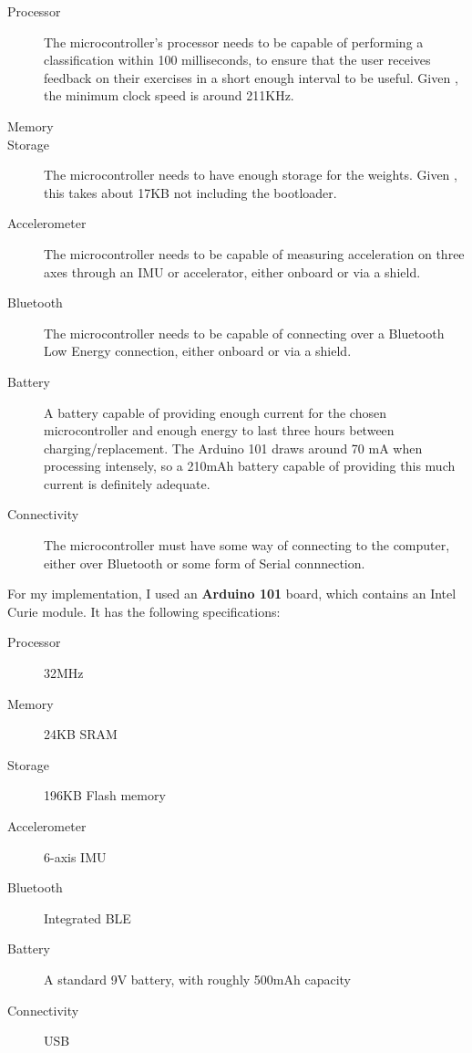 \documentclass[a4paper]{article}
\begin{document}
\begin{description}
\item[Processor] The microcontroller's processor needs to be capable of performing a classification within 100 milliseconds, to ensure that the user receives feedback on their exercises in a short enough interval to be useful. Given , the minimum clock speed is around 211KHz.\cite{dsref0}
\item[Memory] 
\item[Storage] The microcontroller needs to have enough storage for the weights. Given , this takes about 17KB not including the bootloader\cite{dsref2}.
\item[Accelerometer] The microcontroller needs to be capable of measuring acceleration on three axes through an IMU or accelerator, either onboard or via a shield.
\item[Bluetooth] The microcontroller needs to be capable of connecting over a Bluetooth Low Energy connection, either onboard or via a shield.
\item[Battery] A battery capable of providing enough current for the chosen microcontroller and enough energy to last three hours between charging/replacement. The Arduino 101 draws around 70 mA when processing intensely,\cite{dsref3} so a 210mAh battery capable of providing this much current is definitely adequate.
\item[Connectivity] The microcontroller must have some way of connecting to the computer, either over Bluetooth or some form of Serial connnection.
\end{description}

For my implementation, I used an \textbf{Arduino 101} board, which contains an Intel Curie module. It has the following specifications:\cite{dsref4}

\begin{description}
\item[Processor] 32MHz
\item[Memory] 24KB SRAM
\item[Storage] 196KB Flash memory
\item[Accelerometer] 6-axis IMU
\item[Bluetooth] Integrated BLE 
\item[Battery] A standard 9V battery, with roughly 500mAh capacity\cite{dsref5}
\item[Connectivity] USB
\end{description}
\end{document}
